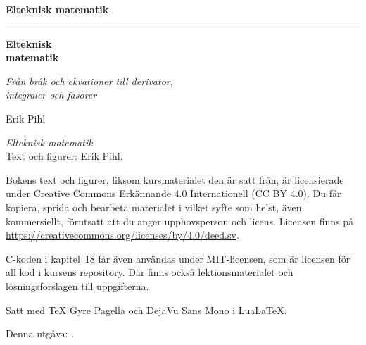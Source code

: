 %
\providecommand{\bookversion}{}

\thispagestyle{empty}
\vspace*{2.2in}
\begin{flushright}
  {\Large\bfseries Elteknisk matematik}
\end{flushright}
\cleardoublepage

\thispagestyle{empty}
\vspace*{1.1in}
\begin{flushleft}
  {\color{accent}\rule{0.9in}{2.5pt}}\par\vspace{1.4ex}
  {\fontsize{32}{38}\selectfont\bfseries Elteknisk\\[0.15ex] matematik\par}
  \vspace{2.2ex}
  {\Large\itshape Från bråk och ekvationer till derivator,\\integraler och fasorer\par}
  \vspace{1.2in}
  {\large Erik Pihl\par}
  \vfill
  \ifx\bookversion\empty\else{\small\color{muted}\bookversion\par}\fi
\end{flushleft}
\newpage

\thispagestyle{empty}
\vspace*{\fill}
{\small
\noindent\textit{Elteknisk matematik}\\
Text och figurer: Erik Pihl.

\medskip
\noindent Bokens text och figurer, liksom kursmaterialet den är satt från, är licensierade under
Creative Commons Erkännande 4.0 Internationell (CC BY 4.0). Du får kopiera, sprida och bearbeta
materialet i vilket syfte som helst, även kommersiellt, förutsatt att du anger upphovsperson och
licens. Licensen finns på \url{https://creativecommons.org/licenses/by/4.0/deed.sv}.

\medskip
\noindent C-koden i kapitel~18 får även användas under MIT-licensen, som är licensen för all kod i
kursens repository. Där finns också lektionsmaterialet och lösningsförslagen till uppgifterna.

\medskip
\noindent Satt med TeX Gyre Pagella och DejaVu Sans Mono i Lua\LaTeX.

\ifx\bookversion\empty\else
\medskip
\noindent\textcolor{muted}{Denna utgåva: \bookversion.}
\fi
\par}
\cleardoublepage
